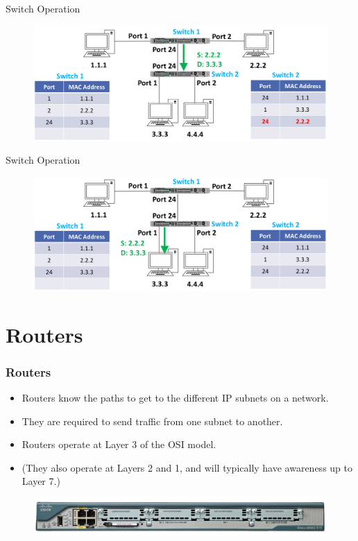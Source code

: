 \documentclass[pdflatex,compress,mathserif]{beamer}
\begin{document}
\begin{frame}{Switch Operation}
	\begin{figure}
		\centering
		\includegraphics[width=\linewidth]{img/img27}
	\end{figure}
\end{frame}

\begin{frame}{Switch Operation}
	\begin{figure}
		\centering
		\includegraphics[width=\linewidth]{img/img28}
	\end{figure}
\end{frame}

\section{Routers}

\begin{frame}
	\frametitle{Routers}
	\begin{itemize}
		\item Routers know the paths to get to the different IP subnets on a network.
		\item They are required to send traffic from one subnet to another.
		\item Routers operate at Layer 3 of the OSI model.
		\item (They also operate at Layers 2 and 1, and will typically have awareness up to Layer 7.)
	\end{itemize}
	\begin{figure}
		\centering
		\includegraphics[width=\linewidth]{img/img29}
	\end{figure}
\end{frame}
\end{document}
